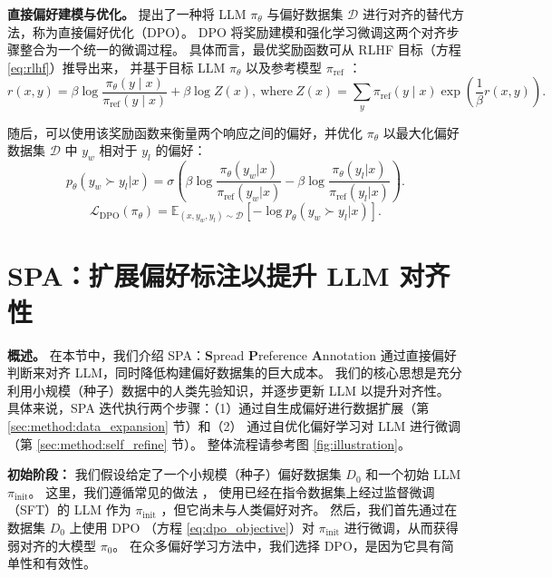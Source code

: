 \textbf{直接偏好建模与优化。}  
\citet{rafailov2023direct} 提出了一种将 LLM $\pi_{\theta}$ 与偏好数据集 $\mathcal{D}$ 进行对齐的替代方法，称为直接偏好优化（DPO）。
DPO 将奖励建模和强化学习微调这两个对齐步骤整合为一个统一的微调过程。
具体而言，最优奖励函数可从 RLHF 目标（方程 \ref{eq:rlhf}）推导出来，
并基于目标 LLM $\pi_{\theta}$ 以及参考模型 $\pi_{\text{ref}}$ 
\citep{go2023aligning, peng2019advantage, peters2007reinforcement}：
\begin{equation}\label{eq:orig_reward}
r(x, y) = \beta \log \frac{\pi_{\theta}(y \mid x)}{\pi_{\text{ref}}(y \mid x)} + \beta \log Z(x),~\text{where}~Z(x) = \sum_y \pi_{\text{ref}}(y \mid x) \exp \left( \frac{1}{\beta} r(x, y) \right). 
\end{equation}

随后，可以使用该奖励函数来衡量两个响应之间的偏好，并优化 $\pi_{\theta}$ 以最大化偏好数据集 $\mathcal{D}$ 中 $y_w$ 相对于 $y_l$ 的偏好：
\begin{equation}\label{eq:orig_pref}
    p_{\theta}(y_{w} \succ y_{l} | x) = \sigma \left(\beta \log \frac{\pi_{\theta}(y_w|x)}{\pi_{\text{ref}}(y_w|x)} - \beta \log \frac{\pi_{\theta}(y_l|x)}{\pi_{\text{ref}}(y_l|x)}\right).
\end{equation}
\begin{equation}\label{eq:dpo_objective}
    \mathcal{L}_\text{DPO}(\pi_{\theta}) = \mathbb{E}_{(x, y_w, y_l) \sim \mathcal{D}} \left[-\log p_{\theta}(y_{w} \succ y_{l} | x) \right].
\end{equation}

\section{SPA：扩展偏好标注以提升 LLM 对齐性} \label{sec:method}

\textbf{概述。}
在本节中，我们介绍 SPA：\textbf{S}pread \textbf{P}reference \textbf{A}nnotation 通过直接偏好判断来对齐 LLM，同时降低构建偏好数据集的巨大成本。  
我们的核心思想是充分利用小规模（种子）数据中的人类先验知识，并逐步更新 LLM 以提升对齐性。  
具体来说，SPA 迭代执行两个步骤：（1）通过自生成偏好进行数据扩展（第 \ref{sec:method:data_expansion} 节）和（2）
通过自优化偏好学习对 LLM 进行微调（第 \ref{sec:method:self_refine} 节）。  
整体流程请参考图 \ref{fig:illustration}。  

\textbf{初始阶段：}  
我们假设给定了一个小规模（种子）偏好数据集 $D_0$ 和一个初始 LLM $\pi_{\text{init}}$。  
这里，我们遵循常见的做法 \citep{ouyang2022training, rafailov2023direct, ziegler2019fine}，
使用已经在指令数据集上经过监督微调（SFT）的 LLM 作为 $\pi_{\text{init}}$ \citep{chung2024scaling, wei2022finetuned}，但它尚未与人类偏好对齐。
然后，我们首先通过在数据集 \(D_0\) 上使用 DPO \citep{rafailov2023direct}（方程 \ref{eq:dpo_objective}）对 \(\pi_{\text{init}}\) 进行微调，从而获得弱对齐的大模型 \(\pi_0\)。  
在众多偏好学习方法中，我们选择 DPO，是因为它具有简单性和有效性。

